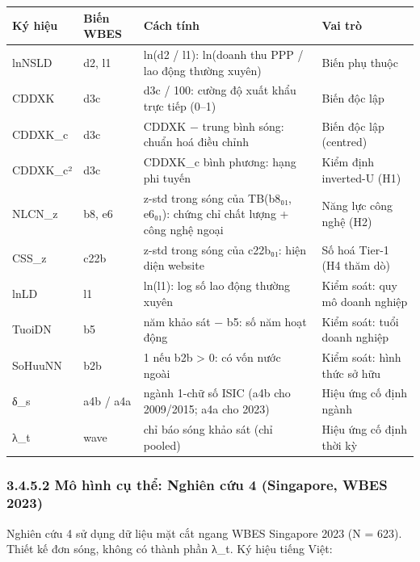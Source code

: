\documentclass[12pt,a4paper]{article}
\begin{document}
\begin{longtable}[]{@{}llll@{}}
\toprule\noalign{}
Ký hiệu & Biến WBES & Cách tính & Vai trò \\
\midrule\noalign{}
\endhead
\bottomrule\noalign{}
\endlastfoot
lnNSLD & d2, l1 & ln(d2 / l1): ln(doanh thu PPP / lao động thường xuyên)
& Biến phụ thuộc \\
CDDXK & d3c & d3c / 100: cường độ xuất khẩu trực tiếp (0--1) & Biến độc
lập \\
CDDXK\_c & d3c & CDDXK − trung bình sóng: chuẩn hoá điều chỉnh & Biến
độc lập (centred) \\
CDDXK\_c² & d3c & CDDXK\_c bình phương: hạng phi tuyến & Kiểm định
inverted-U (H1) \\
NLCN\_z & b8, e6 & z-std trong sóng của TB(b8₀₁, e6₀₁): chứng chỉ chất
lượng + công nghệ ngoại & Năng lực công nghệ (H2) \\
CSS\_z & c22b & z-std trong sóng của c22b₀₁: hiện diện website & Số hoá
Tier-1 (H4 thăm dò) \\
lnLD & l1 & ln(l1): log số lao động thường xuyên & Kiểm soát: quy mô
doanh nghiệp \\
TuoiDN & b5 & năm khảo sát − b5: số năm hoạt động & Kiểm soát: tuổi
doanh nghiệp \\
SoHuuNN & b2b & 1 nếu b2b \textgreater{} 0: có vốn nước ngoài & Kiểm
soát: hình thức sở hữu \\
δ\_s & a4b / a4a & ngành 1-chữ số ISIC (a4b cho 2009/2015; a4a cho 2023)
& Hiệu ứng cố định ngành \\
λ\_t & wave & chỉ báo sóng khảo sát (chỉ pooled) & Hiệu ứng cố định thời
kỳ \\
\end{longtable}

\hypertarget{3452-muxf4-huxecnh-cux1ee5-thux1ec3-nghiuxean-cux1ee9u-4-singapore-wbes-2023}{%
\subsubsection{3.4.5.2 Mô hình cụ thể: Nghiên cứu 4 (Singapore, WBES
2023)}\label{3452-muxf4-huxecnh-cux1ee5-thux1ec3-nghiuxean-cux1ee9u-4-singapore-wbes-2023}}

Nghiên cứu 4 sử dụng dữ liệu mặt cắt ngang WBES Singapore 2023 (N =
623). Thiết kế đơn sóng, không có thành phần λ\_t. Ký hiệu tiếng Việt:
\end{document}

